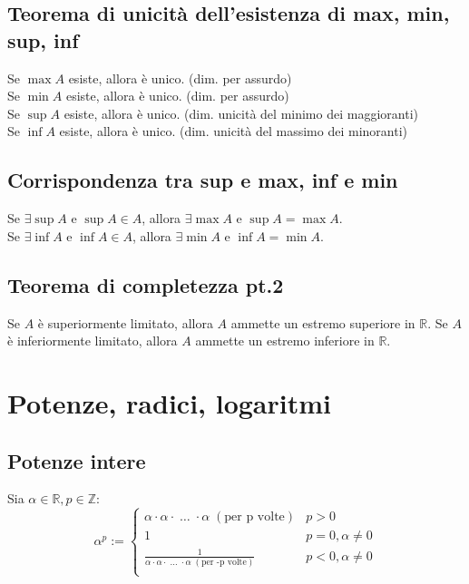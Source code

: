 \documentclass[a4paper]{article}
\begin{document}
\subsection{Teorema di unicità dell'esistenza di max, min, sup, inf}
Se \(\max A\) esiste, allora è unico. (dim. per assurdo) \\
Se \(\min A\) esiste, allora è unico. (dim. per assurdo) \\
Se \(\sup A\) esiste, allora è unico. (dim. unicità del minimo dei maggioranti) \\
Se \(\inf A\) esiste, allora è unico. (dim. unicità del massimo dei minoranti)


\subsection{Corrispondenza tra sup e max, inf e min}
Se \(\exists \sup A\) e \(\sup A \in A\), allora \(\exists \max A\) e \(\sup A = \max A\). \\
Se \(\exists \inf A\) e \(\inf A \in A\), allora \(\exists \min A\) e \(\inf A = \min A\).


\subsection{Teorema di completezza pt.2}
Se \(A\) è superiormente limitato, allora \(A\) ammette un estremo superiore in \(\mathbb{R}\).
Se \(A\) è inferiormente limitato, allora \(A\) ammette un estremo inferiore in \(\mathbb{R}\).


\newpage

\section{Potenze, radici, logaritmi}
\subsection{Potenze intere}
Sia \(\alpha \in \mathbb{R}, p \in \mathbb{Z}\):
\[ \alpha ^ p := 
\begin{cases}
	\alpha \cdot \alpha \cdot \; \dots \; \cdot \alpha \; \left( \text{per p volte} \right) & p > 0 \\
	1 & p = 0, \alpha \neq 0 \\
	\frac{1}{ \alpha \cdot \alpha \cdot \; \dots \; \cdot \alpha \; \left( \text{per -p volte} \right) } & p < 0, \alpha \neq 0 \\
\end{cases}
\]
\end{document}
